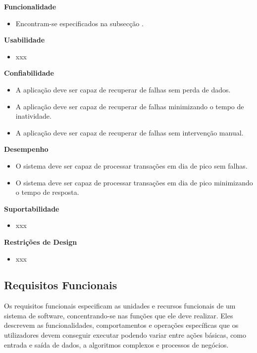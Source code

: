 \vspace{5mm}

\textbf{Funcionalidade}
\begin{itemize}
  \item Encontram-se especificados na subsecção .
\end{itemize}

\textbf{Usabilidade}
\begin{itemize}
  \item xxx
\end{itemize}

\textbf{Confiabilidade}
\begin{itemize}
  \item A aplicação deve ser capaz de recuperar de falhas sem perda de dados.
  \item A aplicação deve ser capaz de recuperar de falhas minimizando o tempo de inatividade.
  \item A aplicação deve ser capaz de recuperar de falhas sem intervenção manual.
\end{itemize}

\textbf{Desempenho}
\begin{itemize}
  \item O sistema deve ser capaz de processar transações em dia de pico sem falhas.
  \item O sistema deve ser capaz de processar transações em dia de pico minimizando o tempo de resposta.
\end{itemize}

\textbf{Suportabilidade}
\begin{itemize}
  \item xxx
\end{itemize}

\textbf{Restrições de Design}
\begin{itemize}
  \item xxx
\end{itemize}

\subsection{Requisitos Funcionais}
\label{sec:3-rf}

Os requisitos funcionais especificam as unidades e recursos funcionais de um sistema de software, 
concentrando-se nas funções que ele deve realizar. Eles descrevem as funcionalidades, comportamentos
e operações específicas que os utilizadores devem conseguir executar podendo variar entre ações básicas, 
como entrada e saída de dados, a algoritmos complexos e processos de negócios.

